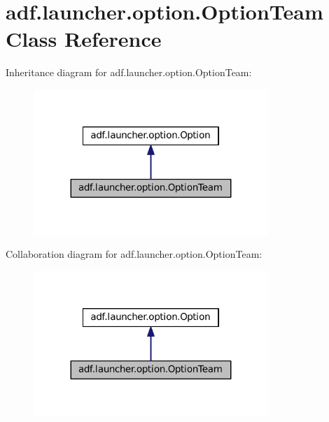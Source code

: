 \hypertarget{classadf_1_1launcher_1_1option_1_1OptionTeam}{}\section{adf.\+launcher.\+option.\+Option\+Team Class Reference}
\label{classadf_1_1launcher_1_1option_1_1OptionTeam}


Inheritance diagram for adf.\+launcher.\+option.\+Option\+Team\+:
\nopagebreak
\begin{figure}[H]
\begin{center}
\leavevmode
\includegraphics[width=251pt]{classadf_1_1launcher_1_1option_1_1OptionTeam__inherit__graph}
\end{center}
\end{figure}


Collaboration diagram for adf.\+launcher.\+option.\+Option\+Team\+:
\nopagebreak
\begin{figure}[H]
\begin{center}
\leavevmode
\includegraphics[width=251pt]{classadf_1_1launcher_1_1option_1_1OptionTeam__coll__graph}
\end{center}
\end{figure}
